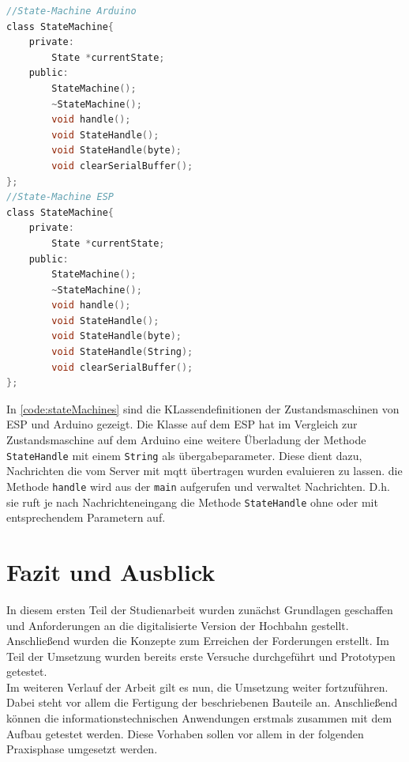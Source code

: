 \begin{lstlisting}[language=c, style=dhpaperdefault]
//State-Machine Arduino
class StateMachine{
	private:
		State *currentState;
	public:
		StateMachine();
		~StateMachine();
		void handle();
		void StateHandle();
		void StateHandle(byte);
		void clearSerialBuffer();
};
//State-Machine ESP
class StateMachine{
	private:
		State *currentState;
	public:
		StateMachine();
		~StateMachine();
		void handle();
		void StateHandle();
		void StateHandle(byte);
		void StateHandle(String);
		void clearSerialBuffer();
};
\end{lstlisting}

In \autoref{code:stateMachines} sind die KLassendefinitionen der Zustandsmaschinen von ESP und Arduino gezeigt. Die Klasse auf dem ESP hat im Vergleich zur Zustandsmaschine auf dem Arduino eine weitere Überladung der Methode \texttt{StateHandle} mit einem \texttt{String} als übergabeparameter. Diese dient dazu, Nachrichten die vom Server mit \acrshort{mqtt} übertragen wurden evaluieren zu lassen. die Methode \texttt{handle} wird aus der \texttt{main} aufgerufen und verwaltet Nachrichten. D.h. sie ruft je nach Nachrichteneingang die Methode \texttt{StateHandle} ohne oder mit entsprechendem Parametern auf. 
%
%
%
%
%
%
%
%
%	


\chapter{Fazit und Ausblick}
In diesem ersten Teil der Studienarbeit wurden zunächst Grundlagen geschaffen und Anforderungen an die digitalisierte Version der Hochbahn gestellt. Anschließend wurden die Konzepte zum Erreichen der Forderungen erstellt. Im Teil der Umsetzung wurden bereits erste Versuche durchgeführt und Prototypen getestet.\\

Im weiteren Verlauf der Arbeit gilt es nun, die Umsetzung weiter fortzuführen. Dabei steht vor allem die Fertigung der beschriebenen Bauteile an. Anschließend können die informationstechnischen Anwendungen erstmals zusammen mit dem Aufbau getestet werden. Diese Vorhaben sollen vor allem in der folgenden Praxisphase umgesetzt werden. 